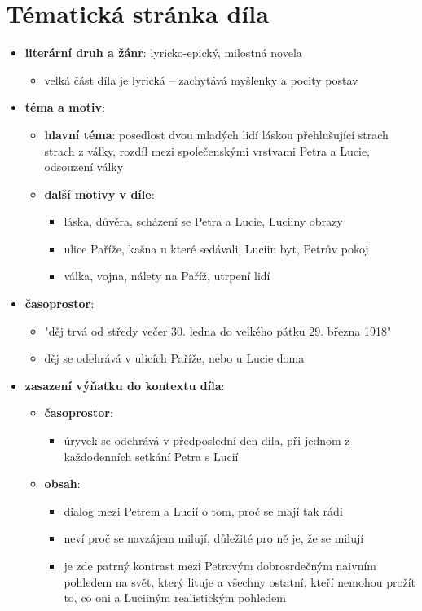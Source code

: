 \documentclass[10pt,a4paper]{article}
\begin{document}
\newpage
\section*{Tématická stránka díla}
\begin{itemize}
\item \textbf{literární druh a žánr}: lyricko-epický, milostná novela
	\begin{itemize}
	\item velká část díla je lyrická -- zachytává myšlenky a pocity postav
	\end{itemize}
\item \textbf{téma a motiv}:
	\begin{itemize}
	\item \textbf{hlavní téma}: posedlost dvou mladých lidí láskou přehlušující strach strach z války, rozdíl mezi společenskými vrstvami Petra a Lucie, odsouzení války
	\item \textbf{další motivy v díle}:
		\begin{itemize}
		\item láska, důvěra, scházení se Petra a Lucie, Luciiny obrazy
		\item ulice Paříže, kašna u které sedávali, Luciin byt, Petrův pokoj
		\item válka, vojna, nálety na Paříž, utrpení lidí
		\end{itemize}
	\end{itemize}
\item \textbf{časoprostor}:
	\begin{itemize}
	\item "děj trvá od středy večer 30. ledna do velkého pátku 29. března 1918"
	\item děj se odehrává v ulicích Paříže, nebo u Lucie doma
	\end{itemize}
\item \textbf{zasazení výňatku do kontextu díla}:
	\begin{itemize}
	\item \textbf{časoprostor}:
		\begin{itemize}
		\item úryvek se odehrává v předposlední den díla, při jednom z každodenních setkání Petra s Lucií
		\end{itemize}
	\item \textbf{obsah}: 
		\begin{itemize}
		\item dialog mezi Petrem a Lucií o tom, proč se mají tak rádi
		\item neví proč se navzájem milují, důležité pro ně je, že se milují
		\item je zde patrný kontrast mezi Petrovým dobrosrdečným naivním pohledem na svět, který lituje a všechny ostatní, kteří nemohou prožít to, co oni a Luciiným realistickým pohledem
		\end{itemize}
	\end{itemize}
\end{itemize}
\end{document}
